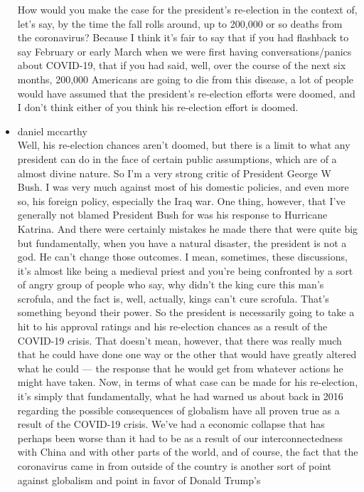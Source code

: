 \begin{itemize}
  How would you make the case for the president's re-election in the
  context of, let's say, by the time the fall rolls around, up to
  200,000 or so deaths from the coronavirus? Because I think it's fair
  to say that if you had flashback to say February or early March when
  we were first having conversations/panics about COVID-19, that if you
  had said, well, over the course of the next six months, 200,000
  Americans are going to die from this disease, a lot of people would
  have assumed that the president's re-election efforts were doomed, and
  I don't think either of you think his re-election effort is doomed.
\item
  daniel mccarthy\\
  Well, his re-election chances aren't doomed, but there is a limit to
  what any president can do in the face of certain public assumptions,
  which are of a almost divine nature. So I'm a very strong critic of
  President George W Bush. I was very much against most of his domestic
  policies, and even more so, his foreign policy, especially the Iraq
  war. One thing, however, that I've generally not blamed President Bush
  for was his response to Hurricane Katrina. And there were certainly
  mistakes he made there that were quite big but fundamentally, when you
  have a natural disaster, the president is not a god. He can't change
  those outcomes. I mean, sometimes, these discussions, it's almost like
  being a medieval priest and you're being confronted by a sort of angry
  group of people who say, why didn't the king cure this man's scrofula,
  and the fact is, well, actually, kings can't cure scrofula. That's
  something beyond their power. So the president is necessarily going to
  take a hit to his approval ratings and his re-election chances as a
  result of the COVID-19 crisis. That doesn't mean, however, that there
  was really much that he could have done one way or the other that
  would have greatly altered what he could --- the response that he
  would get from whatever actions he might have taken. Now, in terms of
  what case can be made for his re-election, it's simply that
  fundamentally, what he had warned us about back in 2016 regarding the
  possible consequences of globalism have all proven true as a result of
  the COVID-19 crisis. We've had a economic collapse that has perhaps
  been worse than it had to be as a result of our interconnectedness
  with China and with other parts of the world, and of course, the fact
  that the coronavirus came in from outside of the country is another
  sort of point against globalism and point in favor of Donald Trump's

\end{itemize}
